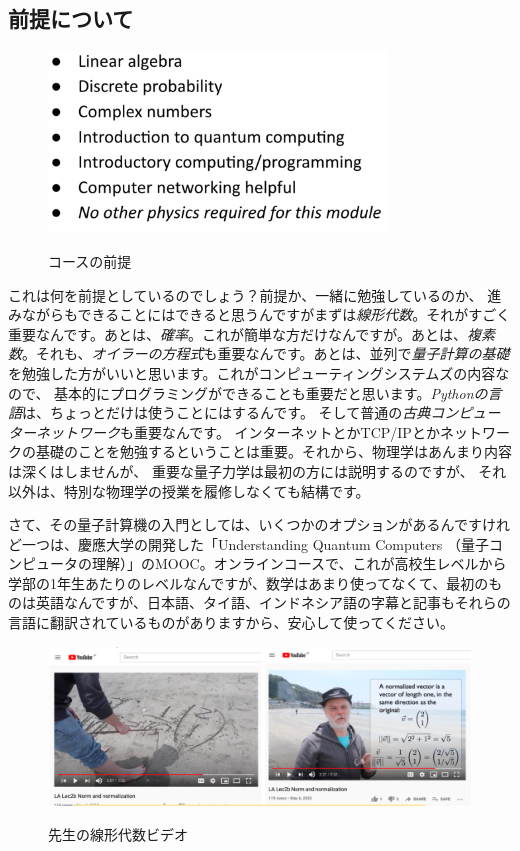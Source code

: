 \subsection{前提について}
\begin{figure}[H]
    \centering
    \includegraphics[width=0.8\textwidth]{lesson1/prereqs.pdf}
    \label{fig: 1}
    \begin{center}
        \caption{コースの前提}
    \end{center}
\end{figure}
これは何を前提としているのでしょう？前提か、一緒に勉強しているのか、
進みながらもできることにはできると思うんですがまずは\emph{線形代数}。それがすごく重要なんです。あとは、\emph{確率}。これが簡単な方だけなんですが。あとは、\emph{複素数}。それも、\emph{オイラーの方程式}も重要なんです。あとは、並列で\emph{量子計算の基礎}を勉強した方がいいと思います。これがコンピューティングシステムズの内容なので、
基本的にプログラミングができることも重要だと思います。\emph{Pythonの言語}は、ちょっとだけは使うことにはするんです。
そして普通の\emph{古典コンピューターネットワーク}も重要なんです。
インターネットとかTCP/IPとかネットワークの基礎のことを勉強するということは重要。それから、物理学はあんまり内容は深くはしませんが、
重要な量子力学は最初の方には説明するのですが、
それ以外は、特別な物理学の授業を履修しなくても結構です。

さて、その量子計算機の入門としては、いくつかのオプションがあるんですけれど一つは、慶應大学の開発した「Understanding Quantum Computers
（量子コンピュータの理解）」のMOOC。オンラインコースで、これが高校生レベルから学部の1年生あたりのレベルなんですが、数学はあまり使ってなくて、最初のものは英語なんですが、日本語、タイ語、インドネシア語の字幕と記事もそれらの言語に翻訳されているものがありますから、安心して使ってください。

\begin{figure}[H]
    \centering
    \includegraphics[width=1.1\textwidth]{lesson1/lin_alg_vids.pdf}
    \label{fig: 1}
    \begin{center}
        \caption{先生の線形代数ビデオ}
    \end{center}
\end{figure}

